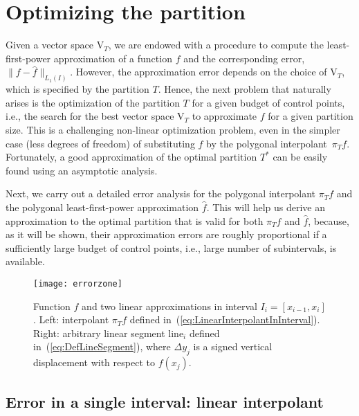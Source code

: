 \documentclass[a4paper,english]{IEEEtran}
\begin{document}
\section{Optimizing the partition\label{sec:Optimizing-the-partition}}

Given a vector space ${\mathrm{V}_{T}}$, we are endowed with a procedure
to compute the least-first-power approximation of a function $f$
and the corresponding error, $\|f-{\hat{f}}\|_{{L_{1}}(I)}$. However,
the approximation error depends on the choice of ${\mathrm{V}_{T}}$, which
is specified by the partition ${T}$. Hence, the next problem that
naturally arises is the optimization of the partition ${T}$ for
a given budget of control points, i.e., the search for the best vector
space ${\mathrm{V}_{T}}$ to approximate $f$ for a given partition size.
This is a challenging non-linear optimization problem, even in the
simpler case (less degrees of freedom) of substituting ${\hat{f}}$ by
the polygonal interpolant~${\pi_{T}} f$. Fortunately, a good approximation
of the optimal partition ${{T}^{\ast}}$ can be easily found using an
asymptotic analysis.

Next, we carry out a detailed error analysis for the polygonal interpolant
${\pi_{T}} f$ and the polygonal least-first-power approximation ${\hat{f}}$.
This will help us derive an approximation to the optimal partition
that is valid for both ${\pi_{T}} f$ and ${\hat{f}}$, because, as it will
be shown, their approximation errors are roughly proportional if a
sufficiently large budget of control points, i.e., large number of
subintervals, is available.

\begin{figure}
\begin{centering}
\texttt{[image: errorzone]}
\par\end{centering}

\caption{\label{fig:errorzone}Function $f$ and two linear approximations
in interval $I_{i}=[x_{i-1},x_{i}]$. Left: interpolant ${\pi_{T}} f$
defined in~(\ref{eq:LinearInterpolantInInterval}). Right: arbitrary
linear segment $\mathrm{line}_{i}$ defined in~(\ref{eq:DefLineSegment}),
where $\Delta y_{j}$ is a signed vertical displacement with respect
to $f(x_{j})$.}

\end{figure}

\subsection{Error in a single interval: linear interpolant\label{sub:Error-Single-Interval}}
\end{document}
